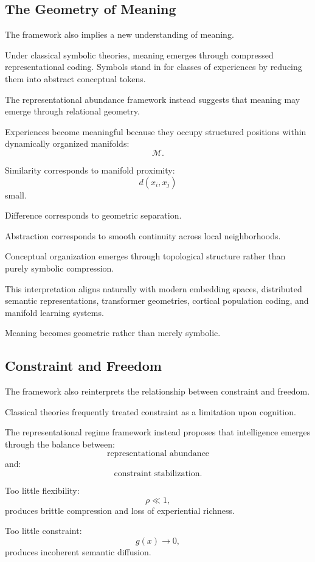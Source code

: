 \documentclass[12pt,a4paper]{article}
\begin{document}
\subsection{The Geometry of Meaning}

The framework also implies a new understanding of meaning.

Under classical symbolic theories, meaning emerges through compressed representational coding. Symbols stand in for classes of experiences by reducing them into abstract conceptual tokens.

The representational abundance framework instead suggests that meaning may emerge through relational geometry.

Experiences become meaningful because they occupy structured positions within dynamically organized manifolds:
\[
\mathcal{M}.
\]

Similarity corresponds to manifold proximity:
\[
d(x_i,x_j)
\]
small.

Difference corresponds to geometric separation.

Abstraction corresponds to smooth continuity across local neighborhoods.

Conceptual organization emerges through topological structure rather than purely symbolic compression.

This interpretation aligns naturally with modern embedding spaces, distributed semantic representations, transformer geometries, cortical population coding, and manifold learning systems.

Meaning becomes geometric rather than merely symbolic.

\subsection{Constraint and Freedom}

The framework also reinterprets the relationship between constraint and freedom.

Classical theories frequently treated constraint as a limitation upon cognition.

The representational regime framework instead proposes that intelligence emerges through the balance between:
\[
\text{representational abundance}
\]
and:
\[
\text{constraint stabilization}.
\]

Too little flexibility:
\[
\rho
\ll
1,
\]
produces brittle compression and loss of experiential richness.

Too little constraint:
\[
g(x)
\rightarrow
0,
\]
produces incoherent semantic diffusion.
\end{document}
